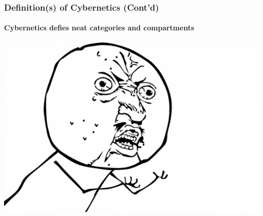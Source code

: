 \documentclass[
	11pt,
	aspectratio=169,
]{beamer}
\begin{document}
		\begin{frame}
			\frametitle{Definition(s) of Cybernetics (Cont'd)}
			\framesubtitle{Cybernetics defies neat categories and compartments}
			\centering\includegraphics[height=0.7\textheight]{./resources/frustrated.png}
		\end{frame}
\end{document}
